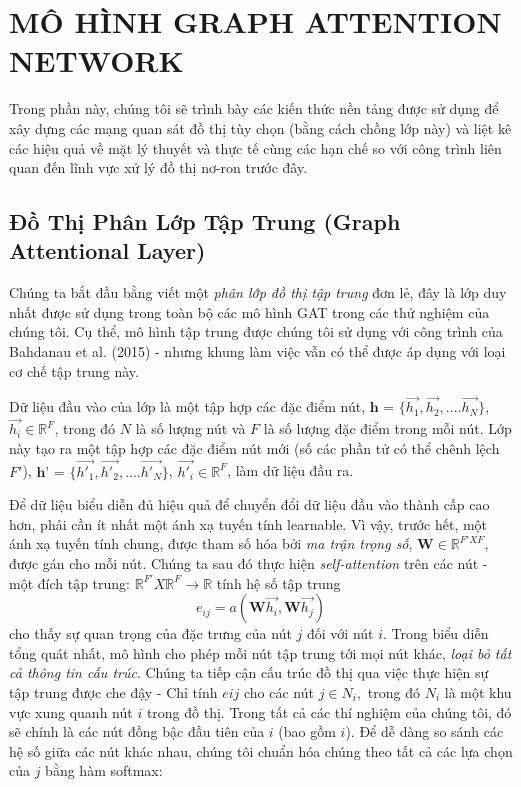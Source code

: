 \chapter{MÔ HÌNH GRAPH ATTENTION NETWORK}
\label{chap:MÔ HÌNH GRAPH ATTENTION NETWORK}


Trong phần này, chúng tôi sẽ trình bày các kiến thức nền tảng được sử dụng để xây dựng các mạng quan sát đồ thị tùy chọn (bằng cách chồng lớp này) và liệt kê các hiệu quả về mặt lý thuyết và thực tế cùng các hạn chế so với công trình liên quan đến lĩnh vực xử lý đồ thị nơ-ron trước đây.

\section{Đồ Thị Phân Lớp Tập Trung (Graph Attentional Layer)}
\label{sec:Đồ Thị Phân Lớp Tập Trung (Graph Attentional Layer)}

Chúng ta bắt đầu bằng viết một \emph{phân lớp đồ thị tập trung} đơn lẻ, đây là lớp duy nhất được sử dụng trong toàn bộ các mô hình GAT trong các thử nghiệm của chúng tôi. Cụ thể, mô hình tập trung được chúng tôi sử dụng  với công trình của Bahdanau et al. (2015) - nhưng khung làm việc vẫn có thể được áp dụng với loại cơ chế tập trung này.

Dữ liệu đầu vào của lớp là một tập hợp các đặc điểm nút, 
\(\textbf{h = } \{\vec{h_1}, \vec{h_2}, .... \vec{h_N} \}\), 
\(\vec{h_i} \in \mathbb{R}^F\),
trong đó $N$ là số lượng nút và $F$ là số lượng đặc điểm trong mỗi nút. 
Lớp này tạo ra một tập hợp các đặc điểm nút mới (số các phần tử có thể chênh lệch $F'$), 
$\textbf{h' = } \{\vec{h'_1}, \vec{h'_2}, .... \vec{h'_N} \}$, $\vec{h'_i} \in \mathbb{R}^F $,
làm dữ liệu đầu ra.

Để dữ liệu biểu diễn đủ hiệu quả để chuyển đổi dữ liệu đầu vào thành cấp cao hơn, phải cần ít nhất một ánh xạ tuyến tính learnable. Vì vậy, trước hết, một ánh xạ tuyến tính chung, được tham số hóa bởi \textit{ma trận trọng số}, 
\(\textbf{W} \in {\mathbb{R}^{F' X F}}\), 
được gán cho mỗi nút. Chúng ta sau đó thực hiện \emph{self-attention} trên các nút - một đích tập trung: 
\(\mathbb{R}^{F'} X \mathbb{R}^{F} \to \mathbb{R}\) 
tính hệ số tập trung
\[ e_{ij} = a(\textbf{W}\vec{h_i}, \textbf{W}\vec{h_j}) \]
cho thấy sự quan trọng của đặc trưng của nút $j$ đối với nút $i$. Trong biểu diễn tổng quát nhất, mô hình cho phép mỗi nút tập trung tới mọi nút khác, \textit{loại bỏ tất cả thông tin cấu trúc}. Chúng ta tiếp cận cấu trúc đồ thị qua việc thực hiện sự tập trung được che đậy - Chỉ tính $eij$ cho các nút $j \in N_i,$ trong đó $N_i$ là một khu vực xung quanh nút $i$ trong đồ thị. Trong tất cả các thí nghiệm của chúng tôi, đó sẽ chính là các nút đồng bậc đầu tiên của $i$ (bao gồm $i$). Để dễ dàng so sánh các hệ số giữa các nút khác nhau, chúng tôi chuẩn hóa chúng theo tất cả các lựa chọn của $j$ bằng hàm softmax:

